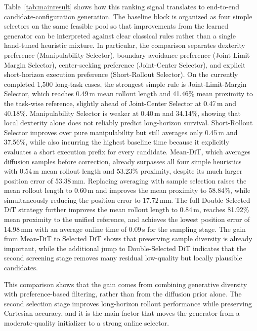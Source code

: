 \documentclass[journal, twoside]{IEEEtran}
\begin{document}
Table~\ref{tab:mainresult} shows how this ranking signal translates to end-to-end candidate-configuration generation. The baseline block is organized as four simple selectors on the same feasible pool so that improvements from the learned generator can be interpreted against clear classical rules rather than a single hand-tuned heuristic mixture. In particular, the comparison separates dexterity preference (Manipulability Selector), boundary-avoidance preference (Joint-Limit-Margin Selector), center-seeking preference (Joint-Center Selector), and explicit short-horizon execution preference (Short-Rollout Selector). On the currently completed 1{,}500 long-task cases, the strongest simple rule is Joint-Limit-Margin Selector, which reaches 0.49\,m mean rollout length and 41.46\% mean proximity to the task-wise reference, slightly ahead of Joint-Center Selector at 0.47\,m and 40.18\%. Manipulability Selector is weaker at 0.40\,m and 34.14\%, showing that local dexterity alone does not reliably predict long-horizon survival. Short-Rollout Selector improves over pure manipulability but still averages only 0.45\,m and 37.56\%, while also incurring the highest baseline time because it explicitly evaluates a short execution prefix for every candidate. Mean-DiT, which averages diffusion samples before correction, already surpasses all four simple heuristics with 0.54\,m mean rollout length and 53.23\% proximity, despite its much larger position error of 53.38\,mm. Replacing averaging with sample selection raises the mean rollout length to 0.60\,m and improves the mean proximity to 58.84\%, while simultaneously reducing the position error to 17.72\,mm. The full Double-Selected DiT strategy further improves the mean rollout length to 0.84\,m, reaches 81.92\% mean proximity to the unified reference, and achieves the lowest position error of 14.98\,mm with an average online time of 0.09\,s for the sampling stage. The gain from Mean-DiT to Selected DiT shows that preserving sample diversity is already important, while the additional jump to Double-Selected DiT indicates that the second screening stage removes many residual low-quality but locally plausible candidates.

This comparison shows that the gain comes from combining generative diversity with preference-based filtering, rather than from the diffusion prior alone. The second selection stage improves long-horizon rollout performance while preserving Cartesian accuracy, and it is the main factor that moves the generator from a moderate-quality initializer to a strong online selector.
\end{document}
